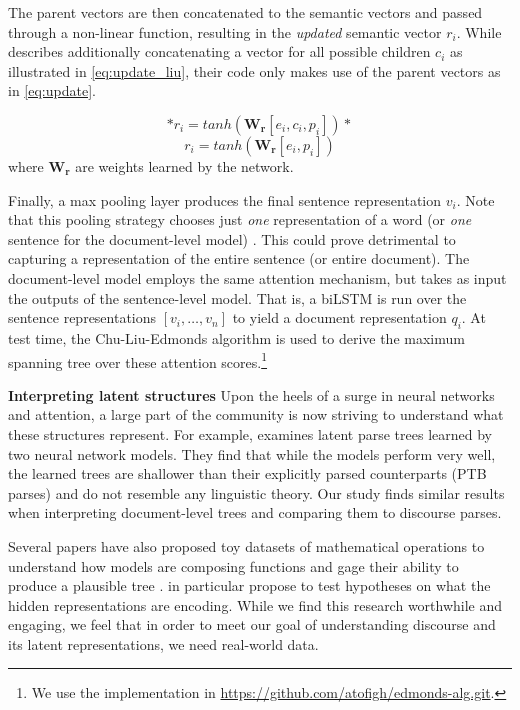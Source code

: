 The parent vectors are then concatenated to the semantic vectors and passed through a non-linear function, resulting in the \emph{updated} semantic vector $r_i$. While  describes additionally concatenating a vector for all possible children $c_i$ as illustrated in \ref{eq:update_liu}, their code only makes use of the parent vectors as in \ref{eq:update}.

\begin{equation}
\label{eq:update_liu}
*r_i = tanh(\boldsymbol{W_r}[e_i, c_i, p_i])*
\end{equation}
\begin{equation}
\label{eq:update}
r_i = tanh(\boldsymbol{W_r}[e_i, p_i])
\end{equation}
where $\boldsymbol{W_r}$ are weights learned by the network.

Finally, a max pooling layer produces the final sentence representation $v_i$. Note that this pooling strategy chooses just \emph{one} representation of a word (or \emph{one} sentence for the document-level model) . This could prove detrimental to capturing a representation of the entire sentence (or entire document). The document-level model employs the same attention mechanism, but takes as input the outputs of the sentence-level model. That is, a biLSTM is run over the sentence representations $[v_i, \ldots, v_n]$ to yield a document representation $q_i$. At test time, the Chu-Liu-Edmonds algorithm is used to derive the maximum spanning tree over these attention scores.\footnote{We use the implementation in \url{https://github.com/atofigh/edmonds-alg.git}.}

\smallskip
\noindent\textbf{Interpreting latent structures} Upon the heels of a surge in neural networks and attention, a large part of the community is now striving to understand what these structures represent. For example,  examines latent parse trees learned by two neural network models. They find that while the models perform very well, the learned trees are shallower than their explicitly parsed counterparts (PTB parses) and do not resemble any linguistic theory. Our study finds similar results when interpreting document-level trees and comparing them to discourse parses. 

Several papers have also proposed toy datasets of mathematical operations to understand how models are composing functions and gage their ability to produce a plausible tree \cite{Hupkes:2017,Nangia:2018}.  in particular propose  to test hypotheses on what the hidden representations are encoding. While we find this research worthwhile and engaging, we feel that in order to meet our goal of understanding discourse and its latent representations, we need real-world data.

